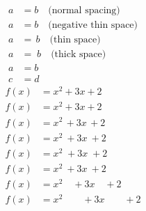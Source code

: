 \documentclass{article}
\begin{document}
\begin{align}
a &= b \quad \text{(normal spacing)} \\
a &=\!b \quad \text{(negative thin space)} \\
a &=\,b \quad \text{(thin space)} \\
a &=\;b \quad \text{(thick space)} \\
a &= b \\[10pt]  %
c &= d
\end{align}
\begin{align*}
f(x) &= x^2\! +3x\! +2 \\
f(x) &= x^2+3x+2 \\
f(x) &= x^2\, +3x\, +2 \\
f(x) &= x^2\: +3x\: +2 \\
f(x) &= x^2\; +3x\; +2 \\
f(x) &= x^2\ +3x\ +2 \\
f(x) &= x^2\quad +3x\quad +2 \\
f(x) &= x^2\qquad +3x\qquad +2
\end{align*}
\end{document}
